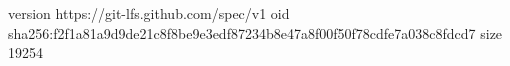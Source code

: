 version https://git-lfs.github.com/spec/v1
oid sha256:f2f1a81a9d9de21c8f8be9e3edf87234b8e47a8f00f50f78cdfe7a038c8fdcd7
size 19254
